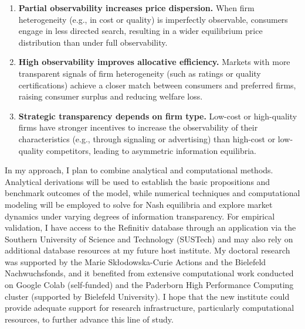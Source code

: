 \documentclass{nfr}
\begin{document}
\begin{enumerate}%
    \item \textbf{Partial observability increases price dispersion.} When firm heterogeneity (e.g., in cost or quality) is imperfectly observable, consumers engage in less directed search, resulting in a wider equilibrium price distribution than under full observability.
    
    \item \textbf{High observability improves allocative efficiency.} Markets with more transparent signals of firm heterogeneity (such as ratings or quality certifications) achieve a closer match between consumers and preferred firms, raising consumer surplus and reducing welfare loss.
    
    \item \textbf{Strategic transparency depends on firm type.} Low-cost or high-quality firms have stronger incentives to increase the observability of their characteristics (e.g., through signaling or advertising) than high-cost or low-quality competitors, leading to asymmetric information equilibria.
\end{enumerate}


In my approach, I plan to combine analytical and computational methods. Analytical derivations will be used to establish the basic propositions and benchmark outcomes of the model, while numerical techniques and computational modeling will be employed to solve for Nash equilibria and explore market dynamics under varying degrees of information transparency. For empirical validation, I have access to the Refinitiv database through an application via the Southern University of Science and Technology (SUSTech) and may also rely on additional database resources at my future host institute. My doctoral research was supported by the Marie Skłodowska-Curie Actions and the Bielefeld Nachwuchsfonds, and it benefited from extensive computational work conducted on Google Colab (self-funded) and the Paderborn High Performance Computing cluster (supported by Bielefeld University). I hope that the new institute could provide adequate support for research infrastructure, particularly computational resources, to further advance this line of study.
\end{document}
